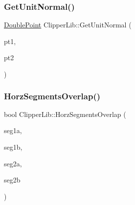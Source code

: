 \mbox{\label{namespace_clipper_lib_a5a62f42148b8b9991da9cfe8cb9cb065}} 
\subsubsection{\texorpdfstring{GetUnitNormal()}{GetUnitNormal()}}
{\footnotesize\ttfamily \mbox{\hyperlink{struct_clipper_lib_1_1_double_point}{Double\+Point}} Clipper\+Lib\+::\+Get\+Unit\+Normal (\begin{DoxyParamCaption}\item[{const \mbox{\hyperlink{struct_clipper_lib_1_1_int_point}{Int\+Point}} \&}]{pt1,  }\item[{const \mbox{\hyperlink{struct_clipper_lib_1_1_int_point}{Int\+Point}} \&}]{pt2 }\end{DoxyParamCaption})}

\mbox{\label{namespace_clipper_lib_a8d010407c49e1ea2e092dd21d8684de4}} 
\subsubsection{\texorpdfstring{HorzSegmentsOverlap()}{HorzSegmentsOverlap()}}
{\footnotesize\ttfamily bool Clipper\+Lib\+::\+Horz\+Segments\+Overlap (\begin{DoxyParamCaption}\item[{\mbox{\hyperlink{namespace_clipper_lib_a7156730a24951629192d4831334bafaa}{c\+Int}}}]{seg1a,  }\item[{\mbox{\hyperlink{namespace_clipper_lib_a7156730a24951629192d4831334bafaa}{c\+Int}}}]{seg1b,  }\item[{\mbox{\hyperlink{namespace_clipper_lib_a7156730a24951629192d4831334bafaa}{c\+Int}}}]{seg2a,  }\item[{\mbox{\hyperlink{namespace_clipper_lib_a7156730a24951629192d4831334bafaa}{c\+Int}}}]{seg2b }\end{DoxyParamCaption})}

\mbox{\label{namespace_clipper_lib_a1b822f020efce65b1e0c4fcdb264fd35}} 

